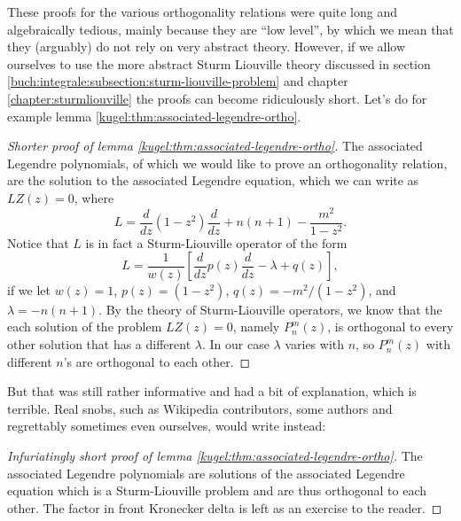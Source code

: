 These proofs for the various orthogonality relations were quite long and
algebraically tedious, mainly because they are ``low level'', by which we mean
that they (arguably) do not rely on very abstract theory. However, if we allow
ourselves to use the more abstract Sturm Liouville theory discussed in section
\ref{buch:integrale:subsection:sturm-liouville-problem} and chapter
\ref{chapter:sturmliouville} the proofs can become ridiculously short. Let's do
for example lemma \ref{kugel:thm:associated-legendre-ortho}.

\begin{proof}[Shorter proof of lemma 
  \ref{kugel:thm:associated-legendre-ortho}]
  The associated Legendre polynomials, of which we would like to prove an
  orthogonality relation, are the solution to the associated Legendre equation,
  which we can write as $LZ(z) = 0$, where
  \begin{equation*}
    L = \frac{d}{dz} (1 - z^2) \frac{d}{dz}
      + n(n+1) - \frac{m^2}{1 - z^2}.
  \end{equation*}
  Notice that $L$ is in fact a Sturm-Liouville operator of the form
  \begin{equation*}
    L = \frac{1}{w(z)} \left[
        \frac{d}{dz} p(z) \frac{d}{dz} - \lambda + q(z)
      \right],
  \end{equation*}
  if we let $w(z) = 1$, $p(z) = (1 - z^2 )$, $q(z) = -m^2 / (1 - z^2)$, and
  $\lambda = -n(n+1)$. By the theory of Sturm-Liouville operators, we know that
  the each solution of the problem $LZ(z) = 0$, namely $P^m_n(z)$, is orthogonal
  to every other solution that has a different $\lambda$. In our case $\lambda$
  varies with $n$, so $P^m_n(z)$ with different $n$'s are orthogonal to each
  other.
\end{proof}

But that was still rather informative and had a bit of explanation, which is
terrible. Real snobs, such as Wikipedia contributors, some authors and
regrettably sometimes even ourselves, would write instead:

\begin{proof}[Infuriatingly short proof of lemma
  \ref{kugel:thm:associated-legendre-ortho}]
  The associated Legendre polynomials are solutions of the associated Legendre
  equation which is a Sturm-Liouville problem and are thus orthogonal to each
  other. The factor in front Kronecker delta is left as an exercise to the
  reader.
\end{proof}

